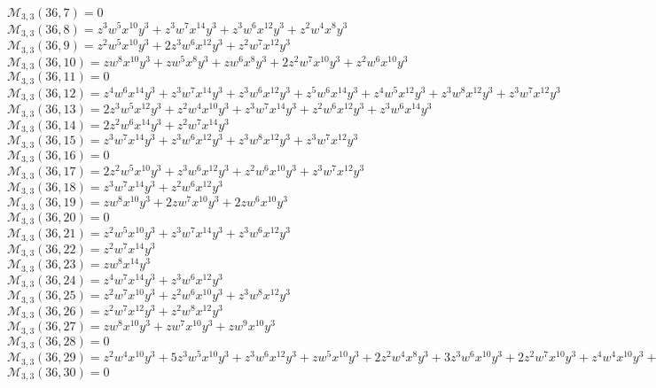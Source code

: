 $\mathcal{M}_{3,3}(36,7)=0$\\
$\mathcal{M}_{3,3}(36,8)=z^3w^5x^{10}y^3+z^3w^7x^{14}y^3+z^3w^6x^{12}y^3+z^2w^4x^8y^3$\\
$\mathcal{M}_{3,3}(36,9)=z^2w^5x^{10}y^3+2z^3w^6x^{12}y^3+z^2w^7x^{12}y^3$\\
$\mathcal{M}_{3,3}(36,10)=zw^8x^{10}y^3+zw^5x^8y^3+zw^6x^8y^3+2z^2w^7x^{10}y^3+z^2w^6x^{10}y^3$\\
$\mathcal{M}_{3,3}(36,11)=0$\\
$\mathcal{M}_{3,3}(36,12)=z^4w^6x^{14}y^3+z^3w^7x^{14}y^3+z^3w^6x^{12}y^3+z^5w^6x^{14}y^3+z^4w^5x^{12}y^3+z^3w^8x^{12}y^3+z^3w^7x^{12}y^3$\\
$\mathcal{M}_{3,3}(36,13)=2z^3w^5x^{12}y^3+z^2w^4x^{10}y^3+z^3w^7x^{14}y^3+z^2w^6x^{12}y^3+z^3w^6x^{14}y^3$\\
$\mathcal{M}_{3,3}(36,14)=2z^2w^6x^{14}y^3+z^2w^7x^{14}y^3$\\
$\mathcal{M}_{3,3}(36,15)=z^3w^7x^{14}y^3+z^3w^6x^{12}y^3+z^3w^8x^{12}y^3+z^3w^7x^{12}y^3$\\
$\mathcal{M}_{3,3}(36,16)=0$\\
$\mathcal{M}_{3,3}(36,17)=2z^2w^5x^{10}y^3+z^3w^6x^{12}y^3+z^2w^6x^{10}y^3+z^3w^7x^{12}y^3$\\
$\mathcal{M}_{3,3}(36,18)=z^3w^7x^{14}y^3+z^2w^6x^{12}y^3$\\
$\mathcal{M}_{3,3}(36,19)=zw^8x^{10}y^3+2zw^7x^{10}y^3+2zw^6x^{10}y^3$\\
$\mathcal{M}_{3,3}(36,20)=0$\\
$\mathcal{M}_{3,3}(36,21)=z^2w^5x^{10}y^3+z^3w^7x^{14}y^3+z^3w^6x^{12}y^3$\\
$\mathcal{M}_{3,3}(36,22)=z^2w^7x^{14}y^3$\\
$\mathcal{M}_{3,3}(36,23)=zw^8x^{14}y^3$\\
$\mathcal{M}_{3,3}(36,24)=z^4w^7x^{14}y^3+z^3w^6x^{12}y^3$\\
$\mathcal{M}_{3,3}(36,25)=z^2w^7x^{10}y^3+z^2w^6x^{10}y^3+z^3w^8x^{12}y^3$\\
$\mathcal{M}_{3,3}(36,26)=z^2w^7x^{12}y^3+z^2w^8x^{12}y^3$\\
$\mathcal{M}_{3,3}(36,27)=zw^8x^{10}y^3+zw^7x^{10}y^3+zw^9x^{10}y^3$\\
$\mathcal{M}_{3,3}(36,28)=0$\\
$\mathcal{M}_{3,3}(36,29)=z^2w^4x^{10}y^3+5z^3w^5x^{10}y^3+z^3w^6x^{12}y^3+zw^5x^{10}y^3+2z^2w^4x^8y^3+3z^3w^6x^{10}y^3+2z^2w^7x^{10}y^3+z^4w^4x^{10}y^3+z^2w^5x^8y^3$\\
$\mathcal{M}_{3,3}(36,30)=0$\\
